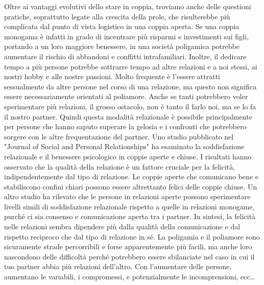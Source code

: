\documentclass[12pt]{book} %
\begin{document}
Oltre ai vantaggi evolutivi dello stare in coppia, troviamo anche delle questioni pratiche, soprattutto legate alla
crescita della prole, che risulterebbe più complicata dal punto di vista logistico in una coppia aperta. 
Se una coppia monogama è infatti in grado di incentrare più
risparmi e investimenti sui figli, portando a un loro maggiore benessere, in una società poligamica potrebbe aumentare
il rischio di abbandoni e conflitti intrafamiliari. Inoltre, il dedicare tempo a più persone potrebbe sottrarre tempo ad altre relazioni e a noi stessi, ai nostri hobby e alle nostre passioni. Molto frequente è l'essere 
attratti sessualmente da altre persone nel corso di una relazione, ma questo non significa essere necessariamente
orientati al poliamore. Anche se tanti potrebbero voler sperimentare più relazioni, il grosso ostacolo, non è tanto il
farlo noi, ma se lo fa il nostro partner. Quindi questa modalità relazionale è possibile principalmente per persone che hanno saputo superare la gelosia e i confronti che potrebbero sorgere con le altre frequentazione del partner. 
Uno studio pubblicato nel "Journal of Social and Personal Relationships" ha esaminato la soddisfazione relazionale e il benessere psicologico in coppie aperte e chiuse. I risultati hanno osservato che la qualità della relazione è un fattore cruciale per la felicità, indipendentemente dal tipo di relazione. Le coppie aperte che comunicano bene e stabiliscono confini chiari possono essere altrettanto felici delle coppie chiuse.
Un altro studio ha rilevato che le persone in relazioni aperte possono sperimentare livelli simili di soddisfazione relazionale rispetto a quelle in relazioni monogame, purché ci sia consenso e comunicazione aperta tra i partner.
In sintesi, la felicità nelle relazioni sembra dipendere più dalla qualità della comunicazione e dal rispetto reciproco che dal tipo di relazione in sé.
La poligamia e il poliamore sono sicuramente strade percorribili e forse apparentemente più facili, ma anche loro nascondono delle difficoltà perché potrebbero essere sbilanciate nel caso in cui il tuo partner abbia più relazioni dell'altro. Con l'aumentare delle persone, aumentano le variabili, i compromessi, e potenzialmente le incomprensioni, ecc…
\end{document}
